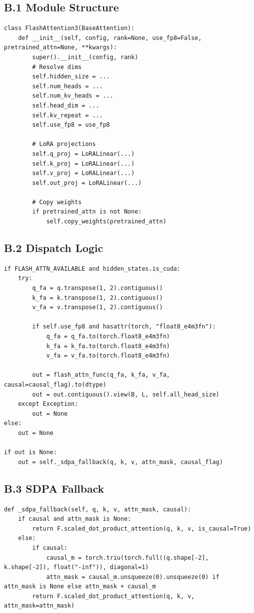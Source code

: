 \subsection{B.1 Module Structure}

\begin{lstlisting}
class FlashAttention3(BaseAttention):
    def __init__(self, config, rank=None, use_fp8=False, pretrained_attn=None, **kwargs):
        super().__init__(config, rank)
        # Resolve dims
        self.hidden_size = ...
        self.num_heads = ...
        self.num_kv_heads = ...
        self.head_dim = ...
        self.kv_repeat = ...
        self.use_fp8 = use_fp8
        
        # LoRA projections
        self.q_proj = LoRALinear(...)
        self.k_proj = LoRALinear(...)
        self.v_proj = LoRALinear(...)
        self.out_proj = LoRALinear(...)
        
        # Copy weights
        if pretrained_attn is not None:
            self.copy_weights(pretrained_attn)
\end{lstlisting}

\subsection{B.2 Dispatch Logic}

\begin{lstlisting}
if FLASH_ATTN_AVAILABLE and hidden_states.is_cuda:
    try:
        q_fa = q.transpose(1, 2).contiguous()
        k_fa = k.transpose(1, 2).contiguous()
        v_fa = v.transpose(1, 2).contiguous()
        
        if self.use_fp8 and hasattr(torch, "float8_e4m3fn"):
            q_fa = q_fa.to(torch.float8_e4m3fn)
            k_fa = k_fa.to(torch.float8_e4m3fn)
            v_fa = v_fa.to(torch.float8_e4m3fn)
        
        out = flash_attn_func(q_fa, k_fa, v_fa, causal=causal_flag).to(dtype)
        out = out.contiguous().view(B, L, self.all_head_size)
    except Exception:
        out = None
else:
    out = None

if out is None:
    out = self._sdpa_fallback(q, k, v, attn_mask, causal_flag)
\end{lstlisting}

\subsection{B.3 SDPA Fallback}

\begin{lstlisting}
def _sdpa_fallback(self, q, k, v, attn_mask, causal):
    if causal and attn_mask is None:
        return F.scaled_dot_product_attention(q, k, v, is_causal=True)
    else:
        if causal:
            causal_m = torch.triu(torch.full((q.shape[-2], k.shape[-2]), float("-inf")), diagonal=1)
            attn_mask = causal_m.unsqueeze(0).unsqueeze(0) if attn_mask is None else attn_mask + causal_m
        return F.scaled_dot_product_attention(q, k, v, attn_mask=attn_mask)
\end{lstlisting}

